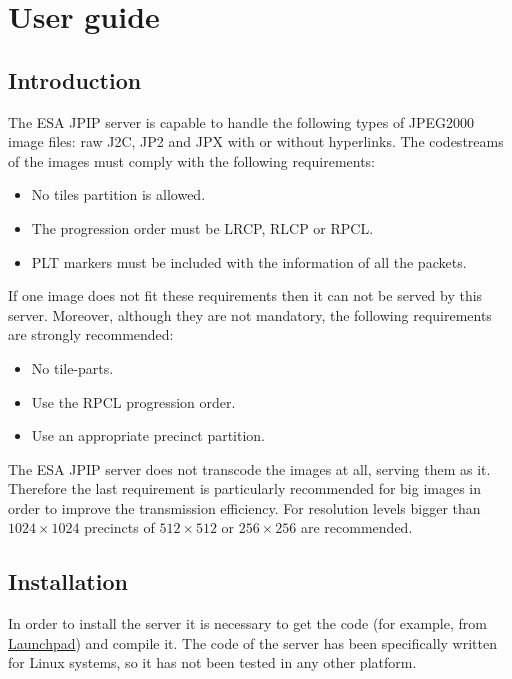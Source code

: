 \chapter{User guide}

\section{Introduction}
\label{introduction}

The ESA JPIP server is capable to handle the following types of JPEG2000 image files:
raw J2C, JP2 and JPX with or without hyperlinks. The codestreams of the images
must comply with the following requirements:

\begin{itemize}
\item No tiles partition is allowed.
\item The progression order must be LRCP, RLCP or RPCL.
\item PLT markers must be included with the information of all the packets.
\end{itemize}

If one image does not fit these requirements then it can not be served by this
server. Moreover, although they are not mandatory, the following requirements
are strongly recommended:

\begin{itemize}
\item No tile-parts.
\item Use the RPCL progression order.
\item Use an appropriate precinct partition.
\end{itemize}

The ESA JPIP server does not transcode the images at all, serving them as it. 
Therefore the last requirement is particularly recommended for big images in
order to improve the transmission efficiency. For resolution levels bigger 
than $1024 \times 1024$ precincts of $512 \times 512$ or $256 \times 256$ are
recommended.

\section{Installation}

In order to install the server it is necessary to get the code (for example,
from \href{https://code.launchpad.net/esajpip}{Launchpad}) and compile it.
The code of the server has been specifically written for Linux systems, so it
has not been tested in any other platform.

